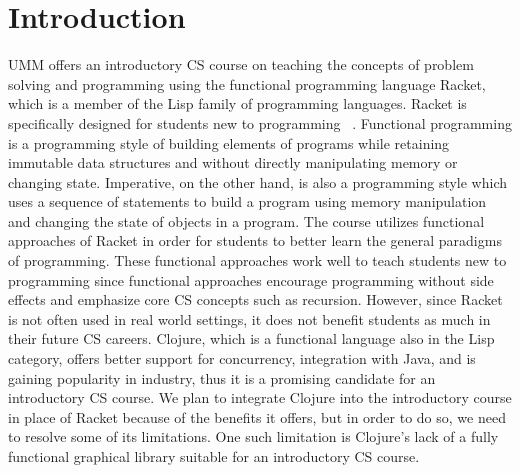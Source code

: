 \documentclass[12pt]{article}
\newcommand{\comment}[1]{{\bf \tt  {#1}}}
\newcommand{\emcomment}[1]{\textcolor{ForestGreen}{\comment{Elena: {#1}}}}
\newcommand{\todo}[1]{\textcolor{blue}{\comment{To Do: {#1}}}}
\begin{document}
\newpage
\setcounter{page}{1}

\section{Introduction}\label{sec:intro}
UMM offers an introductory CS course on teaching the concepts of problem solving and programming using the functional programming language Racket, which is a member of the Lisp family of programming languages. Racket is specifically designed for students new to programming ~\cite{htdp}. Functional programming is a programming style of building elements of programs while retaining immutable data structures 
and without directly manipulating memory or changing state. Imperative, on the other hand, is also a programming style which uses a sequence of statements to build a program using memory manipulation and changing the state of objects in a program. 
The course utilizes functional approaches of Racket in order for students to better learn the general paradigms of programming. These functional approaches work well to teach students new to programming since functional approaches encourage programming without side effects and emphasize core CS concepts such as recursion. However, since Racket is not often used in real world settings, it does not benefit students as much in their future CS careers. Clojure, which is a functional language also in the Lisp category, offers better support for concurrency, integration with Java, and is gaining popularity in industry, thus it is a promising candidate for an introductory CS course. We plan to integrate Clojure into the introductory course in place of Racket because of the benefits it offers, but in order to do so, we need to resolve some of its limitations. One such limitation is Clojure's lack of a fully functional graphical library suitable for an introductory CS course. 
\end{document}

